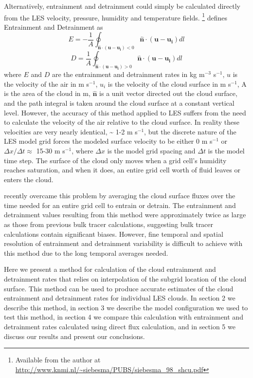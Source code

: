 \documentclass[12pt]{article}
\begin{document}
Alternatively, entrainment and detrainment could simply be calculated directly 
from the LES velocity, pressure, humidity and temperature fields.  
\cite{Siebesma1998}\footnote{Available from the author at
\url{http://www.knmi.nl/~siebesma/PUBS/siebesma_98_shcu.pdf}} defines Entrainment and Detrainment as
\begin{equation}
E = -\frac{1}{A}\oint_{\mathbf{\hat{n}}\cdot(\mathbf{u} - \mathbf{u_i}) < 0}
\mathbf{\hat{n}}\cdot(\mathbf{u}-\mathbf{u_i})dl
\end{equation}
\begin{equation}
D = \frac{1}{A}\oint_{\mathbf{\hat{n}}\cdot(\mathbf{u} - \mathbf{u_i}) > 0}
\mathbf{\hat{n}}\cdot(\mathbf{u}-\mathbf{u_i})dl
\end{equation}
where $E$ and $D$ are the entrainment and detrainment rates in kg m$^{-3}$ 
s$^{-1}$, $u$ is the velocity of the air in m s$^{-1}$, $u_i$ is the velocity 
of the cloud surface in m s$^{-1}$, A is the area of the cloud in m,
$\mathbf{\hat{n}}$ is a unit vector directed out the cloud surface, and the 
path integral is taken around the cloud surface at a constant vertical level.
However, the accuracy of this method applied to LES suffers from the need to 
calculate the velocity of the air relative to the cloud surface.  In reality 
these velocities are very nearly identical, \textasciitilde{} 1-2 m s$^{-1}$, 
but the discrete nature of the LES model grid forces the modeled surface 
velocity to be either 0 m s$^{-1}$ or $\Delta x / \Delta t \approx$ 
15-30 m s$^{-1}$, where $\Delta x$ is the model grid spacing and $\Delta t$ 
is the model time step.  The surface of the cloud only moves when a grid 
cell's humidity reaches saturation, and when it does, an entire grid cell 
worth of fluid leaves or enters the cloud.

\cite{Romps2010} recently overcame this problem by averaging the cloud surface 
fluxes over the time needed for an entire grid cell to entrain or detrain.  
The entrainment and detrainment values resulting from this method were 
approximately twice as large as those from previous bulk tracer calculations, 
suggesting bulk tracer calculations contain significant biases.  However, fine 
temporal and spatial resolution of entrainment and detrainment variability is 
difficult to achieve with this method due to the long temporal averages needed.

Here we present a method for calculation of the cloud entrainment and 
detrainment rates that relies on interpolation of the subgrid location of 
the cloud surface.  This method can be used to produce accurate estimates of 
the cloud entrainment and detrainment rates for individual LES clouds.  In 
section 2 we describe this method, in section 3 we describe the 
model configuration we used to test this method, in section 4 we compare this 
calculation with entrainment and detrainment rates calculated using 
\cite{Romps2010} direct flux calculation, and in section 5 we discuss 
our results and present our conclusions.  
\end{document}
